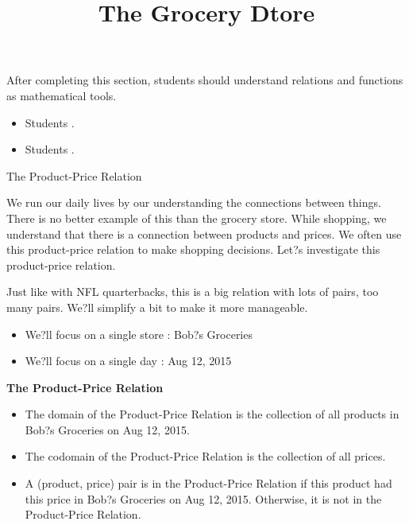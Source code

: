 \documentclass{ximera}
\title{The Grocery Dtore}
\begin{document}
\begin{abstract}
\end{abstract}

\maketitle

\begin{sectionOutcomes}

After completing this section, students should understand relations and functions as mathematical tools. 

\begin{itemize}
\item Students .
\item Students .
\end{itemize}

\end{sectionOutcomes}


\Large{The Product-Price Relation}



We run our daily lives by our understanding the connections between things.  There is no better example of this than the grocery store.  While shopping, we understand that there is a connection between products and prices. We often use this product-price relation to make shopping decisions.  Let?s investigate this product-price relation.

Just like with NFL quarterbacks, this is a big relation with lots of pairs, too many pairs.  We?ll simplify a bit to make it more manageable. 

\begin{itemize}
\item We?ll focus on a single store : Bob?s Groceries
\item We?ll focus on a single day : Aug 12, 2015
\end{itemize}


\begin{definition}
\textbf{The Product-Price Relation}
\begin{itemize}
\item The domain of the Product-Price Relation is the collection of all products in Bob?s Groceries on Aug 12, 2015. 
\item The codomain of the Product-Price Relation is the collection of all prices. 
\item A (product, price) pair is in the Product-Price Relation if this product had this price in Bob?s Groceries on Aug 12, 2015. Otherwise, it is not in the Product-Price Relation.
\end{itemize}
\end{definition}
\end{document}
